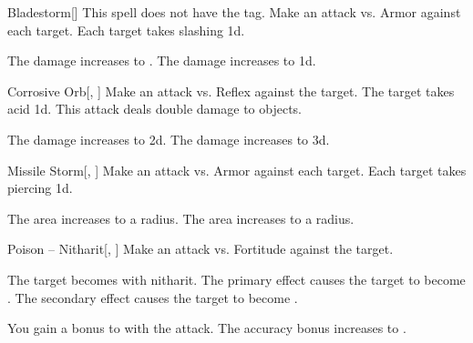 \lowercase{\hypertarget{spell:Bladestorm}{}}\label{spell:Bladestorm}
\begin{freeability}[Rank 3]{\hypertarget{spell:Bladestorm}{Bladestorm}}[]
This spell does not have the  tag.
Make an attack vs. Armor against each target.
\hit Each target takes slashing  \minus1d.

\rankline
{} The damage increases to .
 The damage increases to  \plus1d.
\end{freeability}
\vspace{0.25em}



\lowercase{\hypertarget{spell:Corrosive Orb}{}}\label{spell:Corrosive Orb}
\begin{freeability}[Rank 3]{\hypertarget{spell:Corrosive Orb}{Corrosive Orb}}[, ]
Make an attack vs. Reflex against the target.
\hit The target takes acid  \plus1d.
This attack deals double damage to objects.

\rankline
{} The damage increases to  \plus2d.
 The damage increases to  \plus3d.
\end{freeability}
\vspace{0.25em}



\lowercase{\hypertarget{spell:Missile Storm}{}}\label{spell:Missile Storm}
\begin{freeability}[Rank 3]{\hypertarget{spell:Missile Storm}{Missile Storm}}[, ]
Make an attack vs. Armor against each target.
\hit Each target takes piercing  \minus1d.

\rankline
{} The area increases to a \arealarge radius.
 The area increases to a \areahuge radius.
\end{freeability}
\vspace{0.25em}



\lowercase{\hypertarget{spell:Poison -- Nitharit}{}}\label{spell:Poison -- Nitharit}
\begin{freeability}[Rank 3]{\hypertarget{spell:Poison -- Nitharit}{Poison -- Nitharit}}[, ]
Make an attack vs. Fortitude against the target.

\hit The target becomes  with nitharit.
The primary effect causes the target to become .
The secondary effect causes the target to become .

\rankline
{} You gain a  bonus to  with the attack.
 The accuracy bonus increases to .
\end{freeability}
\vspace{0.25em}



